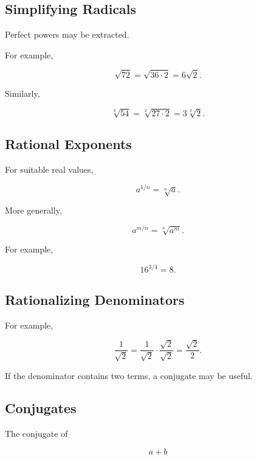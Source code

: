 \subsection{Simplifying Radicals}
\label{subsec:simplifying-radicals}

Perfect powers may be extracted.

For example,

\[ \sqrt{72}=\sqrt{36\cdot2}=6\sqrt2. \]

Similarly,

\[ \sqrt[3]{54}=\sqrt[3]{27\cdot2}=3\sqrt[3]{2}. \]

\subsection{Rational Exponents}
\label{subsec:rational-exponents}

For suitable real values,

\[ a^{1/n}=\sqrt[n]{a}. \]

More generally,

\[ a^{m/n}=\sqrt[n]{a^m}. \]

For example,

\[ 16^{3/4}=8. \]

\subsection{Rationalizing Denominators}
\label{subsec:rationalizing-denominators}

For example,

\[ \frac1{\sqrt2}
=\frac1{\sqrt2}\cdot\frac{\sqrt2}{\sqrt2}
=\frac{\sqrt2}{2}. \]

If the denominator contains two terms, a conjugate may be useful.

\subsection{Conjugates}
\label{subsec:conjugates}

The conjugate of

\[ a+b \]


